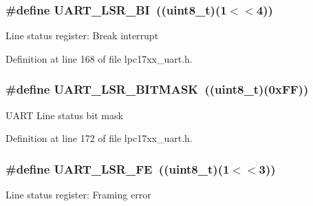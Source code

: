 \subsubsection[{\texorpdfstring{U\+A\+R\+T\+\_\+\+L\+S\+R\+\_\+\+BI}{UART_LSR_BI}}]{\setlength{\rightskip}{0pt plus 5cm}\#define U\+A\+R\+T\+\_\+\+L\+S\+R\+\_\+\+BI~(({\bf uint8\+\_\+t})(1$<$$<$4))}\hypertarget{group___u_a_r_t___private___macros_gaaca4bb43e62c7085534b67576e1ddbeb}{}\label{group___u_a_r_t___private___macros_gaaca4bb43e62c7085534b67576e1ddbeb}
Line status register\+: Break interrupt 

Definition at line 168 of file lpc17xx\+\_\+uart.\+h.

\subsubsection[{\texorpdfstring{U\+A\+R\+T\+\_\+\+L\+S\+R\+\_\+\+B\+I\+T\+M\+A\+SK}{UART_LSR_BITMASK}}]{\setlength{\rightskip}{0pt plus 5cm}\#define U\+A\+R\+T\+\_\+\+L\+S\+R\+\_\+\+B\+I\+T\+M\+A\+SK~(({\bf uint8\+\_\+t})(0x\+F\+F))}\hypertarget{group___u_a_r_t___private___macros_ga3643d58e12f1d3bf342d140a5e3cb1ae}{}\label{group___u_a_r_t___private___macros_ga3643d58e12f1d3bf342d140a5e3cb1ae}
U\+A\+RT Line status bit mask 

Definition at line 172 of file lpc17xx\+\_\+uart.\+h.

\subsubsection[{\texorpdfstring{U\+A\+R\+T\+\_\+\+L\+S\+R\+\_\+\+FE}{UART_LSR_FE}}]{\setlength{\rightskip}{0pt plus 5cm}\#define U\+A\+R\+T\+\_\+\+L\+S\+R\+\_\+\+FE~(({\bf uint8\+\_\+t})(1$<$$<$3))}\hypertarget{group___u_a_r_t___private___macros_ga18b1661d7c37ab40c9310311dd4f647d}{}\label{group___u_a_r_t___private___macros_ga18b1661d7c37ab40c9310311dd4f647d}
Line status register\+: Framing error 

